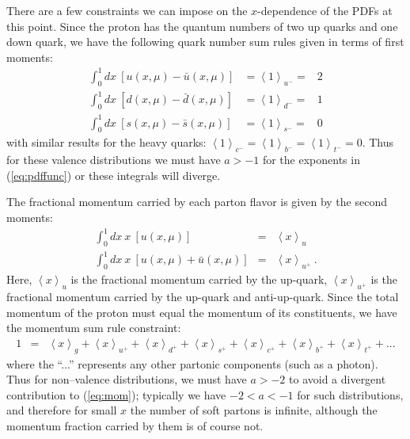 There are a few constraints we
can impose on the $x$-dependence of the PDFs at this point. Since
the proton has the quantum numbers of two up quarks and one down quark,
we have the following quark number sum rules given in terms of first
moments: 
%
\begin{eqnarray}
\int_{0}^{1}dx\ \left[u(x,\mu)-\bar{u}(x,\mu)\right] & =\left\langle 1\right\rangle _{u^{-}}= & 2\\
\int_{0}^{1}dx\ \left[d(x,\mu)-\bar{d}(x,\mu)\right] & =\left\langle 1\right\rangle _{d^{-}}= & 1\\
\int_{0}^{1}dx\ \left[s(x,\mu)-\bar{s}(x,\mu)\right] & =\left\langle 1\right\rangle _{s^{-}}= & 0
\end{eqnarray}
with similar results for the heavy quarks: $\left\langle 1\right\rangle _{c^{-}}=\left\langle 1\right\rangle _{b^{-}}=\left\langle 1\right\rangle _{t^{-}}=0$. Thus for these valence distributions we must have $a>-1$ for the exponents in (\ref{eq:pdffunc}) or these integrals will diverge.

The fractional momentum carried
by each parton flavor is given by the second moments: 
%
\begin{eqnarray}
\int_{0}^{1}dx\ x\ \left[u(x,\mu)\right] & = & \left\langle x\right\rangle _{u}\\
\int_{0}^{1}dx\ x\ \left[u(x,\mu)+\bar{u}(x,\mu)\right] & = & \left\langle x\right\rangle _{u^{+}}\ .
\end{eqnarray}
%
Here, $\left\langle x\right\rangle _{u}$ is the fractional momentum
carried by the up-quark, $\left\langle x\right\rangle _{u^{+}}$ is
the fractional momentum carried by the up-quark and anti-up-quark.
Since the total momentum of the proton must equal the momentum of
its constituents, we have the momentum sum rule constraint: 
%
\begin{eqnarray}\label{eq:mom}
1 & = & \left\langle x\right\rangle _{g}+\left\langle x\right\rangle _{u^{+}}+\left\langle x\right\rangle _{d^{+}}+\left\langle x\right\rangle _{s^{+}}+\left\langle x\right\rangle _{c^{+}}+\left\langle x\right\rangle _{b^{+}}+\left\langle x\right\rangle _{t^{+}}+...
\end{eqnarray}
%
where the ``...'' represents any other partonic components (such
as a photon). Thus for non--valence distributions, we must have $a>-2$ to avoid a divergent contribution to (\ref{eq:mom}); typically we have $-2<a<-1$ for such distributions, and therefore for small $x$ the number of soft partons is infinite, although the momentum fraction carried by them is of course not.

